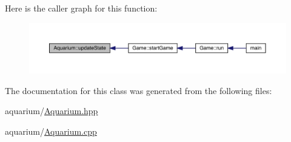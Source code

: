 Here is the caller graph for this function\+:\nopagebreak
\begin{figure}[H]
\begin{center}
\leavevmode
\includegraphics[width=350pt]{class_aquarium_ac9fc0451e82c808d91a32a2e23e9f18e_icgraph}
\end{center}
\end{figure}


The documentation for this class was generated from the following files\+:\begin{DoxyCompactItemize}
\item 
aquarium/\mbox{\hyperlink{_aquarium_8hpp}{Aquarium.\+hpp}}\item 
aquarium/\mbox{\hyperlink{_aquarium_8cpp}{Aquarium.\+cpp}}\end{DoxyCompactItemize}
